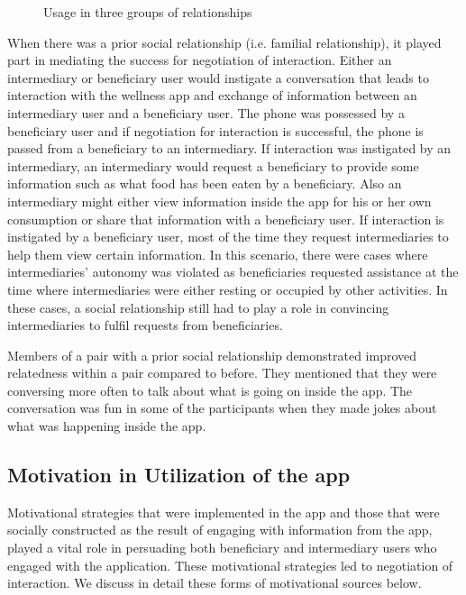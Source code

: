 \documentclass{sig-alternate}
\begin{document}
 \begin{figure}
\centering
{}
\caption{Usage in three groups of relationships}
\label{figure:relation}
\end{figure}

When there was a prior social relationship (i.e. familial relationship), it
played part in mediating the success for negotiation of interaction. Either an
intermediary or beneficiary user would instigate a conversation that leads to
interaction with the wellness app and exchange of information between an
intermediary user and a beneficiary user. The phone was possessed by a
beneficiary user and if negotiation for interaction is successful, the phone
is passed from a beneficiary to an intermediary. If interaction was instigated
by an intermediary, an intermediary would request a beneficiary to provide
some information such as what food has been eaten by a beneficiary. Also an
intermediary might either view information inside the app for his or her own
consumption or share that information with a beneficiary user. If interaction
is instigated by a beneficiary user, most of the time they request
intermediaries to help them view certain information. In this scenario, there
were cases where intermediaries' autonomy was violated as beneficiaries
requested assistance at the time where intermediaries were either resting or
occupied by other activities. In these cases, a social relationship still had
to play a role in convincing intermediaries to fulfil requests from
beneficiaries.

Members of a pair with a prior social relationship demonstrated improved
relatedness within a pair compared to before. They mentioned that they were
conversing more often to talk about what is going on inside the app. The
conversation was fun in some of the participants when they made jokes about
what was happening inside the app.

\subsection{Motivation in Utilization of the app}

Motivational strategies that were implemented in the app and those that were
socially constructed as the result of engaging with information from the app,
played a vital role in persuading both beneficiary and intermediary users who
engaged with the application. These motivational strategies led to negotiation
of interaction. We discuss in detail these forms of motivational sources
below.
\end{document}
